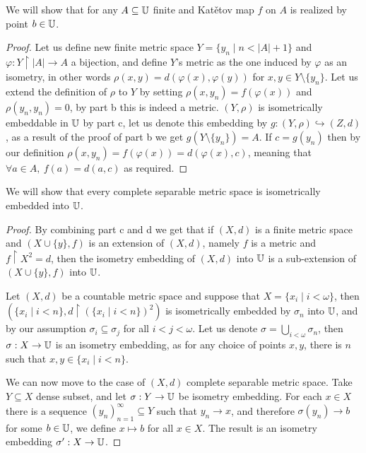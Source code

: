 \subquestion{}
We will show that for any $A \subseteq \mathbb{U}$ finite and Katětov map $f$ on $A$ is realized by point $b \in \mathbb{U}$.
\begin{proof}
	Let us define new finite metric space $Y = \{ y_n \mid n < |A| + 1 \}$ and $\varphi : Y \restriction |A| \to A$ a bijection, and define $Y$'s metric as the one induced by $\varphi$ as an isometry,
	in other words $\rho(x, y) = d(\varphi(x), \varphi(y))$ for $x, y \in Y \setminus \{ y_n \}$.
	Let us extend the definition of $\rho$ to $Y$ by setting $\rho(x, y_n) = f(\varphi(x))$ and $\rho(y_n, y_n) = 0$, by part b this is indeed a metric.
	$(Y, \rho)$ is isometrically embeddable in $\mathbb{U}$ by part c, let us denote this embedding by $g : (Y, \rho) \hookrightarrow (Z, d)$, as a result of the proof of part b we get $g(Y \setminus \{ y_n \}) = A$.
	If $c = g(y_n)$ then by our definition $\rho(x, y_n) = f(\varphi(x)) = d(\varphi(x), c)$, meaning that $\forall a \in A,\ f(a) = d(a, c)$ as required.
\end{proof}

\subquestion{}
We will show that every complete separable metric space is isometrically embedded into $\mathbb{U}$.
\begin{proof}
	By combining part c and d we get that if $(X, d)$ is a finite metric space and $(X \cup \{ y \}, f)$ is an extension of $(X, d)$, namely $f$ is a metric and $f \restriction X^2 = d$,
	then the isometry embedding of $(X, d)$ into $\mathbb{U}$ is a sub-extension of $(X \cup \{ y \}, f)$ into $\mathbb{U}$.

	Let $(X, d)$ be a countable metric space and suppose that $X = \{ x_i \mid i < \omega \}$, then $(\{ x_i \mid i < n \}, d \restriction {(\{ x_i \mid i < n \})}^2)$ is isometrically embedded by $\sigma_n$ into $\mathbb{U}$,
	and by our assumption $\sigma_i \subseteq \sigma_j$ for all $i < j < \omega$.
	Let us denote $\sigma = \bigcup_{i < \omega} \sigma_n$, then $\sigma : X \to \mathbb{U}$ is an isometry embedding, as for any choice of points $x, y$, there is $n$ such that $x, y \in \{ x_i \mid i < n \}$.

	We can now move to the case of $(X, d)$ complete separable metric space.
	Take $Y \subseteq X$ dense subset, and let $\sigma : Y \to \mathbb{U}$ be isometry embedding.
	For each $x \in X$ there is a sequence ${(y_n)}_{n = 1}^{\infty} \subseteq Y$ such that $y_n \to x$, and therefore $\sigma(y_n) \to b$ for some $b \in \mathbb{U}$, we define $x \mapsto b$ for all $x \in X$.
	The result is an isometry embedding $\sigma' : X \to \mathbb{U}$.
\end{proof}

